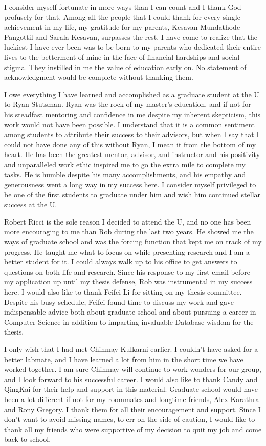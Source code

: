 I consider myself fortunate in more ways than I can count and I thank God profusely for that. 
Among all the people that I could thank for every single achievement in my life, my gratitude for my parents, Kesavan Mundathode Pangottil and Sarala Kesavan, surpasses the rest. 
I have come to realize that the luckiest I have ever been was to be born to my parents who dedicated their entire lives to the betterment of mine in the face of financial hardships and social stigma. 
They instilled in me the value of education early on. No statement of acknowledgment would be complete without thanking them.

I owe everything I have learned and accomplished as a graduate student at the U to Ryan Stutsman. 
Ryan was the rock of my master's education, and if not for his steadfast mentoring and confidence in me despite my inherent skepticism, this work would not have been possible. I understand that it is a common sentiment among students to attribute their success to their advisors, but when I say that I could not have done any of this without Ryan, I mean it from the bottom of my heart. 
He has been the greatest mentor, advisor, and instructor and his positivity and unparalleled work ethic inspired me to go the extra mile to complete my tasks. 
He is humble despite his many accomplishments, and his empathy and generousness went a long way in my success here. 
I consider myself privileged to be one of the first students to graduate under him and wish him continued stellar success at the U.

Robert Ricci is the sole reason I decided to attend the U, and no one has been more encouraging to me than Rob during the last two years. 
He showed me the ways of graduate school and was the forcing function that kept me on track of my progress. 
He taught me what to focus on while presenting research and I am a better student for it. 
I could always walk up to his office to get answers to questions on both life and research. 
Since his response to my first email before my application up until my thesis defense, Rob was instrumental in my success here. 
I would also like to thank Feifei Li for sitting on my thesis committee. Despite his busy schedule, Feifei found time to discuss my work and gave indispensable advice both about graduate school and about pursuing a career in Computer Science in addition to imparting invaluable Database wisdom for the thesis.

I only wish that I had met Chinmay Kulkarni earlier. 
I couldn't have asked for a better labmate, and I have learned a lot from him in the short time we have worked together. 
I am sure Chinmay will continue to work wonders for our group, and I look forward to his successful career. 
I would also like to thank Candy and QingKai for their help and support in this material. 
Graduate school would have been a lot different if not for my roommates and longtime friends, Alex Karathra and Rony Gregory. 
I thank them for all their encouragement and support. Since I don't want to avoid missing names, to err on the side of caution, I would like to thank all my friends who were supportive of my decision to quit my job and come back to school.


